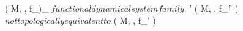 \documentclass[../Main/main]{subfiles}
\begin{document}
{	
	{
		{
			( M, \N, f_\lambda )_{\lambda \in \Lambda} $ functional dynamical system family $.
			\lambda' \in \Lambda
		}
		{
			\all{ \epsilon \in \R^+ }
			{
				{
					( M, \N, f_{\lambda''} ) $ not topologically equivalent to $ ( M, \N, f_{\lambda'} )
				}
			}
		}
	}
	
	
	
	
	
	
	
	
	
	

}
\end{document}

